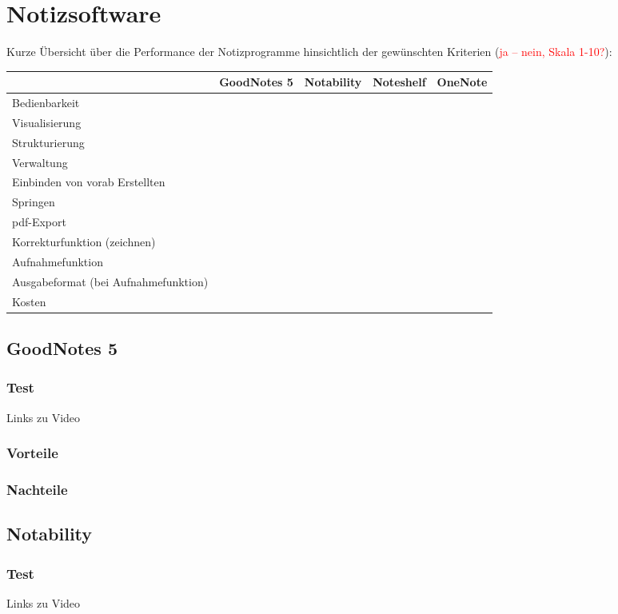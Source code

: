 \documentclass[parskip=off,index=totocnumbered]{scrreprt}
\begin{document}
\chapter{Notizsoftware}
Kurze Übersicht über die Performance der Notizprogramme hinsichtlich der gewünschten Kriterien (\textcolor{red}{ja -- nein, Skala 1-10?}):
\renewcommand*{\arraystretch}{1.2} 
\begin{longtable}{>{\centering \arraybackslash}p{3.2cm}>{\centering \arraybackslash}p{2.2cm}>{\centering \arraybackslash}p{2.2cm}>{\centering \arraybackslash}p{2.2cm}>{\centering \arraybackslash}p{2.2cm}} \toprule
& GoodNotes 5 & Notability & Noteshelf & OneNote \\ \midrule
Bedienbarkeit & & & & \\
Visualisierung & & & & \\
Strukturierung & & & & \\
Verwaltung & & & & \\
Einbinden von vorab Erstellten & & & & \\
Springen & & & & \\
pdf-Export & & & & \\
Korrekturfunktion (zeichnen) & & & & \\
Aufnahmefunktion & & & & \\ 
Ausgabeformat (bei Aufnahmefunktion) & & & & \\
Kosten & & & & \\ \bottomrule
\end{longtable}

\section{GoodNotes 5}
\subsection{Test}
Links zu Video
\subsection{Vorteile}
\subsection{Nachteile}

\section{Notability}
\subsection{Test}
Links zu Video
\end{document}
